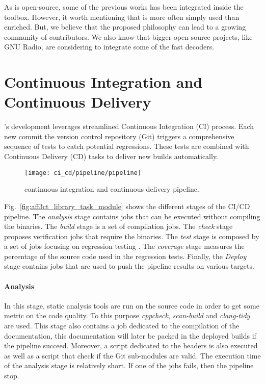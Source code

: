 As \AFFECT is open-source, some of the previous works has been integrated inside
the toolbox. However, it worth mentioning that \AFFECT is more often simply used
than enriched. But, we believe that the proposed philosophy can lead to a
growing community of contributors. We also know that bigger open-source
projects, like GNU Radio, are considering to integrate some of the \AFFECT fast
decoders.

\section{Continuous Integration and Continuous Delivery}
\label{sec:aff3ct_ci_cd}

\AFFECT's development leverages streamlined Continuous Integration (CI) process.
Each new commit the version control repository (Git) triggers a comprehensive
sequence of tests to catch potential regressions. These tests are combined with
Continuous Delivery (CD) tasks to deliver new \AFFECT builds automatically.

\begin{figure}[htp]
  \centering
  \texttt{[image: ci\_cd/pipeline/pipeline]}
  \caption{\AFFECT continuous integration and continuous delivery pipeline.}
  \label{fig:aff3ct_ci_cd_pipeline}
\end{figure}

Fig.~\ref{fig:aff3ct_library_task_module} shows the different stages of the
\AFFECT CI/CD pipeline. The \emph{analysis} stage contains jobs that can be
executed without compiling the \AFFECT binaries. The \emph{build} stage is a set
of compilation jobs. The \emph{check} stage proposes verification jobs that
require the \AFFECT binaries. The \emph{test} stage is composed by a set of jobs
focusing on regression testing . The \emph{coverage} stage measures the
percentage of the \AFFECT source code used in the regression tests. Finally, the
\emph{Deploy} stage contains jobs that are used to push the pipeline results on
various targets.

\paragraph{Analysis}

In this stage, static analysis tools are run on the \AFFECT source code
in order to get some metric on the code quality. To this purpose
\textit{cppcheck}, \textit{scan-build} and \textit{clang-tidy} are used. This
stage also contains a job dedicated to the compilation of the documentation,
this documentation will later be packed in the deployed builds if the pipeline
succeed. Moreover, a script dedicated to the \AFFECT headers is also executed as
well as a script that check if the Git sub-modules are valid. The execution time
of the analysis stage is relatively short. If one of the jobs fails, then the
pipeline stop.

